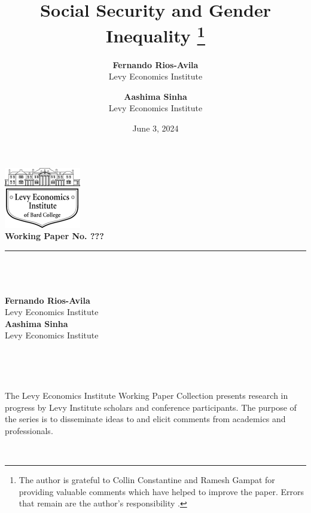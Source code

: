 \documentclass[
  12pt,
]{article}
\title{
        Social Security and Gender Inequality
                    \footnote{The author is grateful to Collin
Constantine and Ramesh Gampat for providing valuable comments which have
helped to improve the paper. Errors that remain are the author's
responsibility .}
            }
\author{
\textbf{Fernando Rios-Avila}
\\
Levy Economics Institute\\[0.5cm]
\and 
\textbf{Aashima Sinha}
\\
Levy Economics Institute\\[0.5cm]
}
\date{June 3, 2024}
\begin{document}
\let\origfootnoterule\footnoterule
\renewcommand{\footnoterule}{}



\begin{titlepage}

\begin{minipage}[t][0.70\textheight][t]{\textwidth} 
\renewcommand{\thempfootnote}{\fnsymbol{mpfootnote}} 
    \centering
    \includegraphics[width=0.25\textwidth]{logo.png}\\[0.25cm]
    \textbf{\large{\textcolor{levyblue}{Working Paper No. ???}}}\\[0.3cm]

    \textcolor{lightgray}{\rule{0.8\textwidth}{0.5mm}}\\[0.5cm]

     \\[0.5cm]
     
     \\[0.5cm]

 
 \textbf{Fernando Rios-Avila}
 \\
 Levy Economics Institute\\[0.5cm]

 \textbf{Aashima Sinha}
 \\
 Levy Economics Institute\\[0.5cm]



 \vfill 
 ~
 \end{minipage}
 

\center{\textcolor{lightgray}{\rule{0.8\textwidth}{0.5mm}}}\\[0.5cm]
        \vfill
    \begin{minipage}[b][0.20\textheight][b]{\textwidth}
    
        
        \begin{minipage}{\textwidth}
            \small
            The Levy Economics Institute Working Paper Collection presents research in progress by Levy Institute scholars and conference participants. The purpose of the series is to disseminate ideas to and elicit comments from academics and professionals.
        \end{minipage}\\[0.5cm]


\end{minipage}
\end{titlepage}
\end{document}
